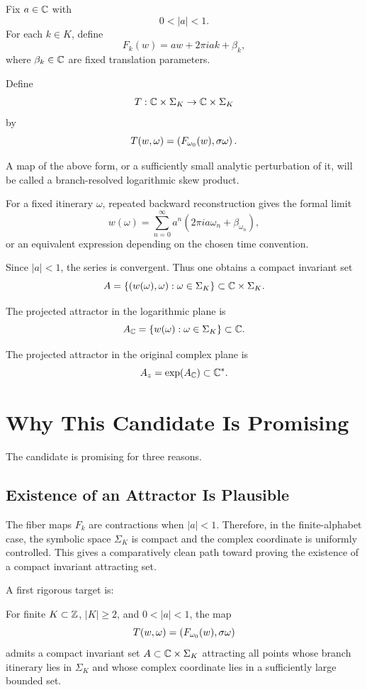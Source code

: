 	Fix \(a\in\mathbb{C}\) with
	\[
	0<|a|<1.
	\]
	For each \(k\in K\), define
	\[
	F_k(w)=a w + 2\pi i a k + \beta_k,
	\]
	where \(\beta_k\in\mathbb{C}\) are fixed translation parameters.
	
	Define
	\[
	T:\mathbb{C}\times \Sigma_K \to \mathbb{C}\times \Sigma_K
	\]
	by
	\[
	T(w,\omega)
	=
	\left(
	F_{\omega_0}(w),
	\sigma\omega
	\right).
	\]
	
	\begin{definition}
		A map of the above form, or a sufficiently small analytic perturbation of it, will be called a branch-resolved logarithmic skew product.
	\end{definition}
	
	For a fixed itinerary \(\omega\), repeated backward reconstruction gives the formal limit
	\[
	w(\omega)
	=
	\sum_{n=0}^{\infty}
	a^n
	\left(
	2\pi i a \omega_n+\beta_{\omega_n}
	\right),
	\]
	or an equivalent expression depending on the chosen time convention.
	
	Since \(|a|<1\), the series is convergent. Thus one obtains a compact invariant set
	\[
	A
	=
	\{
	(w(\omega),\omega)
	:
	\omega\in\Sigma_K
	\}
	\subset \mathbb{C}\times \Sigma_K.
	\]
	
	The projected attractor in the logarithmic plane is
	\[
	A_{\mathbb{C}}
	=
	\{
	w(\omega)
	:
	\omega\in\Sigma_K
	\}
	\subset \mathbb{C}.
	\]
	
	The projected attractor in the original complex plane is
	\[
	A_z
	=
	\exp(A_{\mathbb{C}})
	\subset \mathbb{C}^\ast.
	\]
	
	\section{Why This Candidate Is Promising}
	
	The candidate is promising for three reasons.
	
	\subsection{Existence of an Attractor Is Plausible}
	
	The fiber maps \(F_k\) are contractions when \(|a|<1\). Therefore, in the finite-alphabet case, the symbolic space \(\Sigma_K\) is compact and the complex coordinate is uniformly controlled. This gives a comparatively clean path toward proving the existence of a compact invariant attracting set.
	
	A first rigorous target is:
	
	\begin{conjecture}
		For finite \(K\subset\mathbb{Z}\), \(|K|\geq 2\), and \(0<|a|<1\), the map
		\[
		T(w,\omega)
		=
		(F_{\omega_0}(w),\sigma\omega)
		\]
		admits a compact invariant set \(A\subset \mathbb{C}\times\Sigma_K\) attracting all points whose branch itinerary lies in \(\Sigma_K\) and whose complex coordinate lies in a sufficiently large bounded set.
	\end{conjecture}
	
